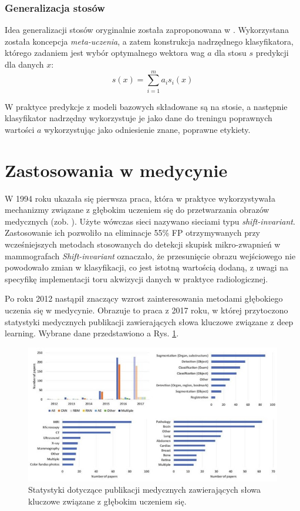 \subsubsection{Generalizacja stosów}
Idea generalizacji stosów oryginalnie została zaproponowana w \cite{Wolpert92stackedgeneralization}. Wykorzystana została koncepcja \textit{meta-uczenia}, a zatem konstrukcja nadrzędnego klasyfikatora, którego zadaniem jest wybór optymalnego wektora wag $a$ dla stosu $s$ predykcji dla danych $x$:
\begin{equation}
s(x) = \sum_{i=1}^{m}a_i s_i(x)
\end{equation}

W praktyce predykcje z modeli bazowych składowane są na stosie, a następnie klasyfikator nadrzędny wykorzystuje je jako dane do treningu poprawnych wartości $a$ wykorzystując jako odniesienie znane, poprawne etykiety.
 

\section{Zastosowania w medycynie}

W 1994 roku ukazała się pierwsza praca, która w praktyce wykorzystywała mechanizmy związane z głębokim uczeniem się do przetwarzania obrazów medycznych (zob. \cite{Zhang1994}). Użyte wówczas sieci nazywano sieciami typu \textit{shift-invariant}. Zastosowanie ich pozwoliło na eliminacje 55\% FP otrzymywanych przy wcześniejszych metodach stosowanych do detekcji skupisk mikro-zwapnień w mammografach \textit{Shift-invariant} oznaczało, że przesunięcie obrazu wejściowego nie powodowało zmian w klasyfikacji, co jest istotną wartością dodaną, z uwagi na specyfikę implementacji toru akwizycji danych w praktyce radiologicznej.

Po roku 2012 nastąpił znaczący wzrost zainteresowania metodami głębokiego uczenia się w medycynie. Obrazuje to praca \cite{Litjens2017} z 2017 roku, w której przytoczono statystyki medycznych publikacji zawierających słowa kluczowe związane z deep learning. Wybrane dane przedstawiono a Rys. \ref{DL_CAD_stats}.
\begin{figure}[h!]
	\centering
	\includegraphics[width=1\textwidth]{figures/DL_CAD_statystyka.jpg}
	\caption{Statystyki dotyczące publikacji medycznych zawierających słowa kluczowe związane z głębokim uczeniem się.}
	\label{DL_CAD_stats}
\end{figure}

